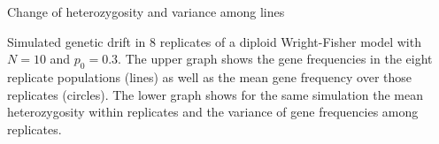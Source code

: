 \documentclass[bluish,slideColor,colorBG,pdf]{prosper}
\begin{document}
\begin{slide}[Replace]{Change of heterozygosity and variance among lines}
\vspace{-0.1in}

\centerline{}
\centerline{}

\noindent
{Simulated genetic drift in 8 replicates of a diploid Wright-Fisher
model with $N = 10$ and $p_0  =  0.3$.  The upper graph shows the gene
frequencies in the eight replicate populations (lines) as well as the mean
gene frequency over those replicates (circles).  The lower graph shows
for the same simulation the
mean heterozygosity within replicates and the variance
of gene frequencies among replicates.}

\end{slide}
\end{document}
